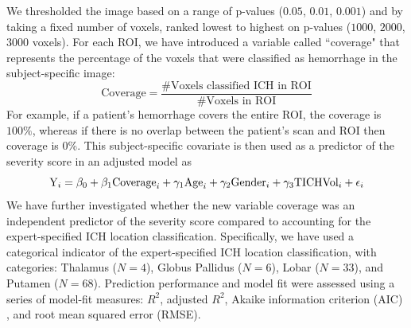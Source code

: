 \documentclass[10pt]{article}\usepackage[]{graphicx}\usepackage[]{color}
\begin{document}
We thresholded the image based on a range of p-values ($0.05$, $0.01$, $0.001$) and by taking a fixed number of voxels, ranked lowest to highest on p-values ($1000$, $2000$, $3000$ voxels).  For each ROI, we have introduced a variable called ``coverage" that represents the percentage of the voxels that were classified as hemorrhage in the subject-specific image: 
\begin{equation}
\text{Coverage} = \frac{\text{\# Voxels classified ICH in ROI}}{\text{\# Voxels in ROI}}
\end{equation}
For example, if a patient's hemorrhage covers the entire ROI, the coverage is $100\%$, whereas if there is no overlap between the patient's scan and ROI then coverage is 0\%.  This subject-specific covariate is then used as a predictor of the severity score in an adjusted model as
$$
{\rm Y}_i = \beta_0 + \beta_1 {\rm Coverage}_i + \gamma_1{\rm Age}_i  +\gamma_2{\rm Gender}_i +\gamma_3{\rm TICHVol}_i + \epsilon_{i}
$$
We have further investigated whether the new variable coverage was an independent predictor of the severity score compared to accounting for the expert-specified ICH location classification. Specifically, we have used 
a categorical indicator of the expert-specified ICH location classification, with categories: Thalamus ($N = 4$), Globus Pallidus ($N = 6$), Lobar ($N = 33$), and Putamen ($N = 68$).  
Prediction performance and model fit were assessed using a series of model-fit measures: $R^2$, adjusted $R^2$, Akaike information criterion (AIC) \citep{akaike_information_1973}, 
and root mean squared error (RMSE).  
\end{document}
